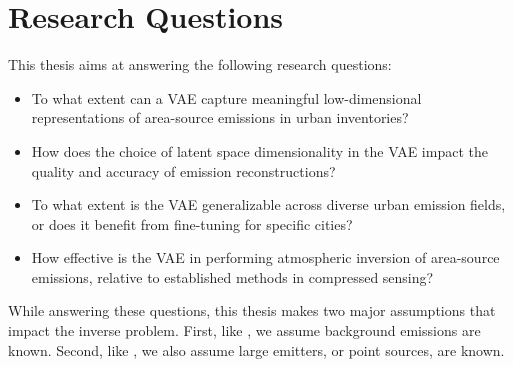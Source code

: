 \section{Research Questions}
This thesis aims at answering the following research questions:

\begin{itemize}
    \item To what extent can a \gls{VAE} capture meaningful low-dimensional representations of area-source emissions in urban inventories?
    \item How does the choice of latent space dimensionality in the \gls{VAE} impact the quality and accuracy of emission reconstructions?
    \item To what extent is the \gls{VAE} generalizable across diverse urban emission fields, or does it benefit from fine-tuning for specific cities?
    \item How effective is the \gls{VAE} in performing atmospheric inversion of area-source emissions, relative to established methods in compressed sensing?
\end{itemize}

While answering these questions, this thesis makes two major assumptions that impact the inverse problem.
First, like \textcite{UrbanSparseReconstruction}, we assume background emissions are known.
Second, like \textcite{JonesInversion}, we also assume large emitters, or point sources, are known.
